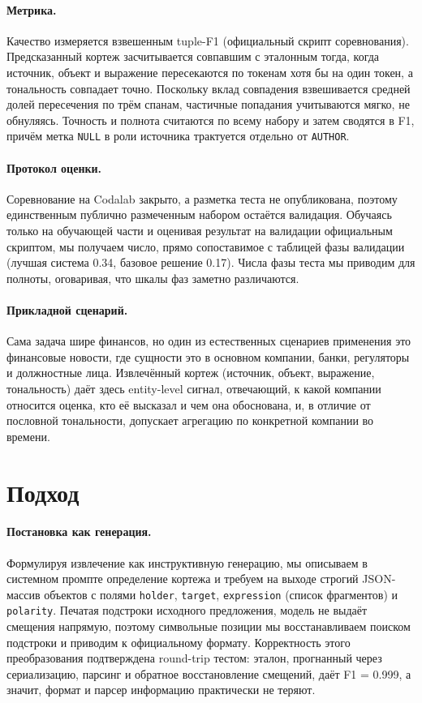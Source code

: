 \documentclass[11pt]{article}
\begin{document}
\paragraph{Метрика.}
Качество измеряется взвешенным tuple-F1 (официальный скрипт соревнования). Предсказанный кортеж засчитывается
совпавшим с эталонным тогда, когда источник, объект и выражение пересекаются по токенам хотя бы на один токен,
а тональность совпадает точно. Поскольку вклад совпадения взвешивается средней долей пересечения по трём спанам,
частичные попадания учитываются мягко, не обнуляясь. Точность и полнота считаются по всему набору и затем сводятся
в F1, причём метка \texttt{NULL} в роли источника трактуется отдельно от \texttt{AUTHOR}.

\paragraph{Протокол оценки.}
Соревнование на Codalab закрыто, а разметка теста не опубликована, поэтому единственным публично размеченным
набором остаётся валидация. Обучаясь только на обучающей части и оценивая результат на валидации официальным
скриптом, мы получаем число, прямо сопоставимое с таблицей фазы валидации (лучшая система 0.34, базовое решение
0.17). Числа фазы теста мы приводим для полноты, оговаривая, что шкалы фаз заметно различаются.

\paragraph{Прикладной сценарий.}
Сама задача шире финансов, но один из естественных сценариев применения это финансовые новости, где
сущности это в основном компании, банки, регуляторы и должностные лица. Извлечённый кортеж
(источник, объект, выражение, тональность) даёт здесь entity-level сигнал,
отвечающий, к какой компании относится оценка, кто её высказал и чем она обоснована, и, в отличие от пословной
тональности, допускает агрегацию по конкретной компании во времени.

\section{Подход}
\paragraph{Постановка как генерация.}
Формулируя извлечение как инструктивную генерацию, мы описываем в системном промпте определение кортежа и требуем
на выходе строгий JSON-массив объектов с полями \texttt{holder}, \texttt{target}, \texttt{expression} (список
фрагментов) и \texttt{polarity}. Печатая подстроки исходного предложения, модель не выдаёт смещения напрямую,
поэтому символьные позиции мы восстанавливаем поиском подстроки и приводим к официальному формату. Корректность
этого преобразования подтверждена round-trip тестом: эталон, прогнанный через сериализацию, парсинг и обратное
восстановление смещений, даёт F1 = 0.999, а значит, формат и парсер информацию практически не теряют.
\end{document}
